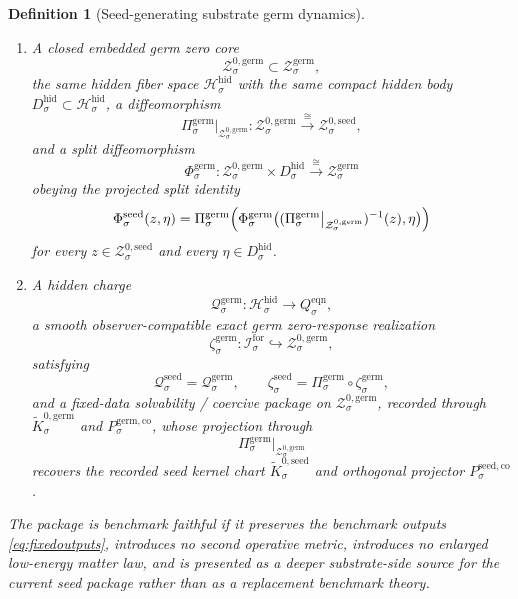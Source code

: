 \documentclass[11pt]{article}
\newcommand{\ForSpace}[1]{\mathcal I_{#1}^{\mathrm{for}}}
\newcommand{\SubPair}[1]{\mathfrak s_{#1}^{\mathrm{sub}}}
\newcommand{\EqnTarget}[1]{Q_{#1}^{\mathrm{eqn}}}
\newcommand{\HiddenSpace}[1]{\mathcal H_{#1}^{\mathrm{hid}}}
\newcommand{\HiddenBody}[1]{D_{#1}^{\mathrm{hid}}}
\newcommand{\SeedSection}[1]{\Gamma_{#1}^{\mathrm{seed}}}
\newcommand{\SeedShellSet}[1]{\mathcal Z_{#1}^{\mathrm{seed}}}
\newcommand{\SeedZeroCore}[1]{\mathcal Z_{#1}^{0,\mathrm{seed}}}
\newcommand{\SeedSplit}[1]{\Phi_{#1}^{\mathrm{seed}}}
\newcommand{\SeedCharge}[1]{\mathcal Q_{#1}^{\mathrm{seed}}}
\newcommand{\SeedEmbed}[1]{\zeta_{#1}^{\mathrm{seed}}}
\newcommand{\SeedKernelCh}[1]{\widetilde K_{#1}^{0,\mathrm{seed}}}
\newcommand{\SeedStateComp}[1]{P_{#1}^{\mathrm{seed,co}}}
\newcommand{\GermBody}[1]{\mathcal B_{#1}^{\mathrm{germ}}}
\newcommand{\GermProj}[1]{\Pi_{#1}^{\mathrm{germ}}}
\newcommand{\GermSeedMin}[1]{\mathfrak f_{#1}^{\mathrm{germ,seed}}}
\newcommand{\GermSection}[1]{\Gamma_{#1}^{\mathrm{germ}}}
\newcommand{\GermFunctional}[1]{\mathscr W_{#1}^{\mathrm{germ}}}
\newcommand{\GermShellSet}[1]{\mathcal Z_{#1}^{\mathrm{germ}}}
\newcommand{\GermZeroCore}[1]{\mathcal Z_{#1}^{0,\mathrm{germ}}}
\newcommand{\GermSplit}[1]{\Phi_{#1}^{\mathrm{germ}}}
\newcommand{\GermCharge}[1]{\mathcal Q_{#1}^{\mathrm{germ}}}
\newcommand{\GermEmbed}[1]{\zeta_{#1}^{\mathrm{germ}}}
\newcommand{\GermKernelCh}[1]{\widetilde K_{#1}^{0,\mathrm{germ}}}
\newcommand{\GermStateComp}[1]{P_{#1}^{\mathrm{germ,co}}}
\newtheorem{definition}{Definition}
\begin{document}
\begin{definition}[Seed-generating substrate germ dynamics]
\begin{enumerate}
\[    \GermFunctional{\sigma}(g)
    \equiv
    \SubPair{\sigma}\bigl(\GermSection{\sigma}(g),\GermSection{\sigma}(g)\bigr),
    \]
    and the exact germ shell
    \[
    \GermShellSet{\sigma}
    \equiv
    \bigl(\GermSection{\sigma}\bigr)^{-1}(0)\cap\GermBody{\sigma},
    \]
    satisfying
    \[
    \GermSection{\sigma}\circ\GermSeedMin{\sigma}
    =
    \SeedSection{\sigma},
    \qquad
    \GermProj{\sigma}\big|_{\GermShellSet{\sigma}}
    :
    \GermShellSet{\sigma}
    \xrightarrow{\cong}
    \SeedShellSet{\sigma}.
    \]
    \item A closed embedded germ zero core
    \[
    \GermZeroCore{\sigma}\subset\GermShellSet{\sigma},
    \]
    the same hidden fiber space \(\HiddenSpace{\sigma}\) with the same compact hidden body \(\HiddenBody{\sigma}\subset\HiddenSpace{\sigma}\), a diffeomorphism
    \[
    \GermProj{\sigma}\big|_{\GermZeroCore{\sigma}}
    :
    \GermZeroCore{\sigma}
    \xrightarrow{\cong}
    \SeedZeroCore{\sigma},
    \]
    and a split diffeomorphism
    \[
    \GermSplit{\sigma}:
    \GermZeroCore{\sigma}\times\HiddenBody{\sigma}
    \xrightarrow{\cong}
    \GermShellSet{\sigma}
    \]
    obeying the projected split identity
    \[
    \SeedSplit{\sigma}(z,\eta)
    =
    \GermProj{\sigma}\Bigl(
    \GermSplit{\sigma}\bigl(
    (\GermProj{\sigma}\big|_{\GermZeroCore{\sigma}})^{-1}(z),\eta
    \bigr)\Bigr)
    \]
    for every \(z\in\SeedZeroCore{\sigma}\) and every \(\eta\in\HiddenBody{\sigma}\).
    \item A hidden charge
    \[
    \GermCharge{\sigma}:\HiddenSpace{\sigma}\to\EqnTarget{\sigma},
    \]
    a smooth observer-compatible exact germ zero-response realization
    \[
    \GermEmbed{\sigma}:\ForSpace{\sigma}\hookrightarrow\GermZeroCore{\sigma},
    \]
    satisfying
    \[
    \SeedCharge{\sigma}
    =
    \GermCharge{\sigma},
    \qquad
    \SeedEmbed{\sigma}
    =
    \GermProj{\sigma}\circ\GermEmbed{\sigma},
    \]
    and a fixed-data solvability / coercive package on \(\GermZeroCore{\sigma}\), recorded through \(\GermKernelCh{\sigma}\) and \(\GermStateComp{\sigma}\), whose projection through
    \[
    \GermProj{\sigma}\big|_{\GermZeroCore{\sigma}}
    \]
    recovers the recorded seed kernel chart \(\SeedKernelCh{\sigma}\) and orthogonal projector \(\SeedStateComp{\sigma}\).
\end{enumerate}
The package is \emph{benchmark faithful} if it preserves the benchmark outputs \eqref{eq:fixedoutputs}, introduces no second operative metric, introduces no enlarged low-energy matter law, and is presented as a deeper substrate-side source for the current seed package rather than as a replacement benchmark theory.
\end{definition}
\end{document}
